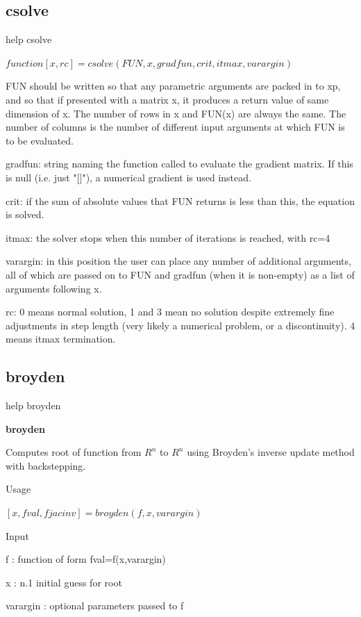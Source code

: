 \documentclass[10pt,math=newtx,citestyle=gb7714-2015,bibstyle=gb7714-2015]{elegantbook}
\begin{document}
{{{	\subsection{csolve}
	
	help csolve
	
	$function [x,rc] = csolve(FUN,x,gradfun,crit,itmax,varargin)$
	
	FUN should be written so that any parametric arguments are packed in to xp, and so that if presented with a matrix x, it produces a return value of same dimension of x.  The number of rows in x and FUN(x) are always the same.  The number of columns is the number of different input arguments at which FUN is to be evaluated.
	
	gradfun:  string naming the function called to evaluate the gradient matrix.  If this is null (i.e. just "[]"), a numerical gradient is used instead.
	
	crit:     if the sum of absolute values that FUN returns is less than this, the equation is solved.
	
	itmax:    the solver stops when this number of iterations is reached, with rc=4
	
	varargin: in this position the user can place any number of additional arguments, all of which are passed on to FUN and gradfun (when it is non-empty) as a list of arguments following x.
	
	rc:       0 means normal solution, 1 and 3 mean no solution despite extremely fine adjustments in step length (very likely a numerical problem, or a discontinuity). 4 means itmax termination.
	
	
	\subsection{broyden}
	
	help broyden
	
	\textbf{broyden}
	
	Computes root of function from $R^n$ to $R^n$ using Broyden's inverse update method with backstepping.
	
	Usage
	
	$[x,fval,fjacinv] = broyden(f,x,varargin)$
	
	Input
	
	f         : function of form fval=f(x,varargin)
	
	x         : n.1 initial guess for root
	
	varargin  : optional parameters passed to f
	
}}}
\end{document}
